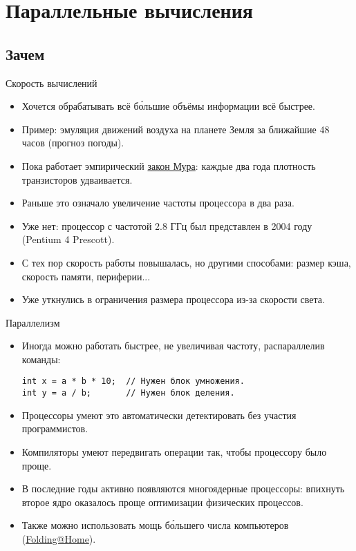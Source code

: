 \section{Параллельные вычисления}
\subsection{Зачем}

\begin{frame}
\end{frame}

\begin{frame}{Скорость вычислений}
	\begin{itemize}
		\item Хочется обрабатывать всё б\'{о}льшие объёмы информации всё быстрее.
		\item Пример: эмуляция движений воздуха на планете Земля за ближайшие 48 часов (прогноз погоды).
		\item Пока работает эмпирический \href{https://ru.wikipedia.org/wiki/\%D0\%97\%D0\%B0\%D0\%BA\%D0\%BE\%D0\%BD\_\%D0\%9C\%D1\%83\%D1\%80\%D0\%B0}{закон Мура}: каждые два года плотность транзисторов удваивается.
		\item Раньше это означало увеличение частоты процессора в два раза.
		\item Уже нет: процессор с частотой 2.8 ГГц был представлен в 2004 году (Pentium 4 Prescott).
		\item С тех пор скорость работы повышалась, но другими способами: размер кэша, скорость памяти, периферии...
		\item Уже уткнулись в ограничения размера процессора из-за скорости света.
	\end{itemize}
\end{frame}

\begin{frame}[fragile]{Параллелизм}
	\begin{itemize}
		\item Иногда можно работать быстрее, не увеличивая частоту, распараллелив команды:
\begin{verbatim}
int x = a * b * 10;  // Нужен блок умножения.
int y = a / b;       // Нужен блок деления.
\end{verbatim}
		\item Процессоры умеют это автоматически детектировать без участия программистов.
		\item Компиляторы умеют передвигать операции так, чтобы процессору было проще.
		\item В последние годы активно появляются многоядерные процессоры: впихнуть второе ядро оказалось проще оптимизации физических процессов.
		\item Также можно использовать мощь б\'{о}льшего числа компьютеров (\href{https://ru.wikipedia.org/wiki/Folding@home}{Folding@Home}).
	\end{itemize}
\end{frame}

